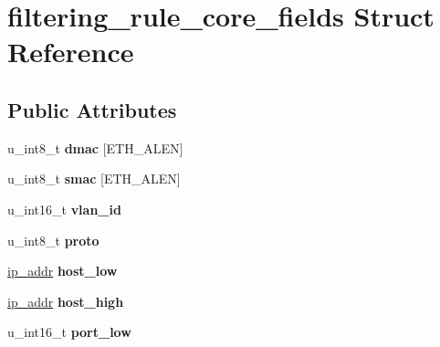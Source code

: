 \hypertarget{structfiltering__rule__core__fields}{
\section{filtering\_\-rule\_\-core\_\-fields Struct Reference}
\label{structfiltering__rule__core__fields}
}
\subsection*{Public Attributes}
\begin{DoxyCompactItemize}
\item 
\hypertarget{structfiltering__rule__core__fields_ad9e28ed422d320d8bdf249c2a40a71d2}{
u\_\-int8\_\-t {\bfseries dmac} \mbox{[}ETH\_\-ALEN\mbox{]}}
\label{structfiltering__rule__core__fields_ad9e28ed422d320d8bdf249c2a40a71d2}

\item 
\hypertarget{structfiltering__rule__core__fields_acf77bac9e04ba219b3ee62f7da88e276}{
u\_\-int8\_\-t {\bfseries smac} \mbox{[}ETH\_\-ALEN\mbox{]}}
\label{structfiltering__rule__core__fields_acf77bac9e04ba219b3ee62f7da88e276}

\item 
\hypertarget{structfiltering__rule__core__fields_a3e345d98a44acdc6e03d7ef0ea988bad}{
u\_\-int16\_\-t {\bfseries vlan\_\-id}}
\label{structfiltering__rule__core__fields_a3e345d98a44acdc6e03d7ef0ea988bad}

\item 
\hypertarget{structfiltering__rule__core__fields_aecf4916428b94f89ff8f5a339cc57cbc}{
u\_\-int8\_\-t {\bfseries proto}}
\label{structfiltering__rule__core__fields_aecf4916428b94f89ff8f5a339cc57cbc}

\item 
\hypertarget{structfiltering__rule__core__fields_a2cc3429380e5c94995eb68f74ce4f99f}{
\hyperlink{unionip__addr}{ip\_\-addr} {\bfseries host\_\-low}}
\label{structfiltering__rule__core__fields_a2cc3429380e5c94995eb68f74ce4f99f}

\item 
\hypertarget{structfiltering__rule__core__fields_af89ba1f278975defdc11541256b8b785}{
\hyperlink{unionip__addr}{ip\_\-addr} {\bfseries host\_\-high}}
\label{structfiltering__rule__core__fields_af89ba1f278975defdc11541256b8b785}

\item 
\hypertarget{structfiltering__rule__core__fields_a7067810a58ae354c30943e43d9ff0017}{
u\_\-int16\_\-t {\bfseries port\_\-low}}
\label{structfiltering__rule__core__fields_a7067810a58ae354c30943e43d9ff0017}


\end{DoxyCompactItemize}
